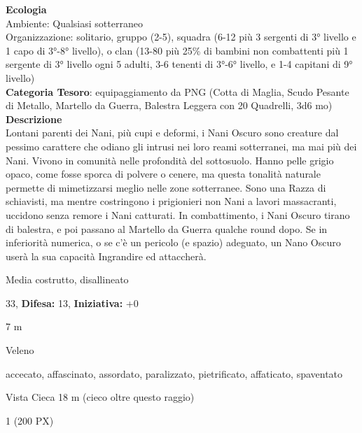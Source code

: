\begin{multicols}{2}
{\textbf{Ecologia}\\
Ambiente: Qualsiasi sotterraneo\\
Organizzazione: solitario, gruppo (2-5), squadra (6-12 più 3 sergenti di 3° livello e 1 capo di 3°-8° livello), o clan (13-80 più 25\% di bambini non combattenti più 1 sergente di 3° livello ogni 5 adulti, 3-6 tenenti di 3°-6° livello, e 1-4 capitani di 9° livello)\\
\textbf{Categoria Tesoro}: equipaggiamento da PNG (Cotta di Maglia, Scudo Pesante di Metallo, Martello da Guerra, Balestra Leggera con 20 Quadrelli, 3d6 mo)\\
\textbf{Descrizione}\\
Lontani parenti dei Nani, più cupi e deformi, i Nani Oscuro sono creature dal pessimo carattere che odiano gli intrusi nei loro reami sotterranei, ma mai più dei Nani. Vivono in comunità nelle profondità del sottosuolo. Hanno pelle grigio opaco, come fosse sporca di polvere o cenere, ma questa tonalità naturale permette di mimetizzarsi meglio nelle zone sotterranee. Sono una Razza di schiavisti, ma mentre costringono i prigionieri non Nani a lavori massacranti, uccidono senza remore i Nani catturati. In combattimento, i Nani Oscuro tirano di balestra, e poi passano al Martello da Guerra qualche round dopo. Se in inferiorità numerica, o se c'è un pericolo (e spazio) adeguato, un Nano Oscuro userà la sua capacità Ingrandire ed attaccherà.


\noindent
\begin{description}[noitemsep, topsep=0pt, parsep=0pt, partopsep=0pt, leftmargin=0cm, labelwidth=2.2cm]
	\item[\textbf{Taglia/Tipo:}] Media costrutto, disallineato
	\item[\textbf{Caratt.:}] 
	\item[\textbf{Punti Ferita:}] 33,  \textbf{Difesa:} 13,  \textbf{Iniziativa:} +0
	\item[\textbf{Movimento:}] 7 m
	\item[\textbf{Tiri Salvez.:}] 
	\item[\textbf{Imm. Danni:}] Veleno
	\item[\textbf{Immunità:}] accecato, affascinato, assordato, paralizzato, pietrificato, affaticato, spaventato
	\item[\textbf{Sensi:}] Vista Cieca 18 m (cieco oltre questo raggio)
	\item[\textbf{Sfida:}] 1 (200 PX)\smallskip
\end{description}

}
\end{multicols}
